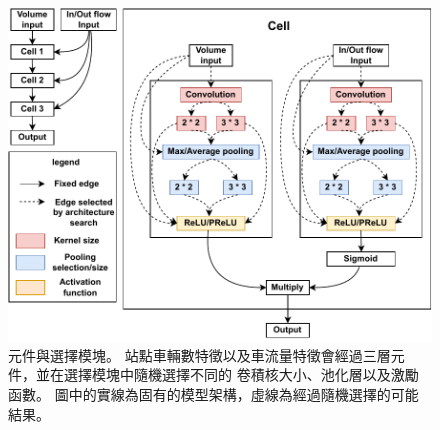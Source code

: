 \documentclass[a4paper,14pt]{extarticle}
\begin{document}
            \begin{figure}[htbp]
                \includegraphics[width=\textwidth]{cell.pdf}
                \caption{
                    元件與選擇模塊。
                    站點車輛數特徵以及車流量特徵會經過三層元件，並在選擇模塊中隨機選擇不同的
                    卷積核大小、池化層以及激勵函數。
                    圖中的實線為固有的模型架構，虛線為經過隨機選擇的可能結果。
                }
                \label{fig:cell}
            \end{figure}
\end{document}
